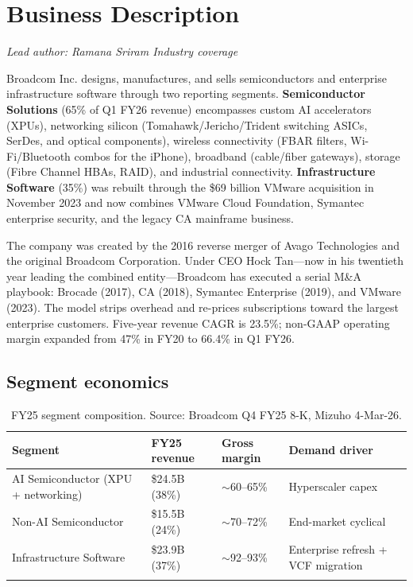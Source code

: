 \documentclass[10pt,letterpaper]{article}
\newcommand{\sectionbyline}[2]{%
\begin{flushright}\vspace{-0.6em}%
{\footnotesize\color{nyugrey}\textit{#1 \textbar{} #2}}%
\end{flushright}\vspace{-0.4em}}
\begin{document}
\section{Business Description}
\sectionbyline{Lead author: Ramana Sriram}{Industry coverage}

Broadcom Inc. designs, manufactures, and sells semiconductors and enterprise infrastructure software through two reporting segments. \textbf{Semiconductor Solutions} (65\% of Q1 FY26 revenue) encompasses custom AI accelerators (XPUs), networking silicon (Tomahawk/Jericho/Trident switching ASICs, SerDes, and optical components), wireless connectivity (FBAR filters, Wi-Fi/Bluetooth combos for the iPhone), broadband (cable/fiber gateways), storage (Fibre Channel HBAs, RAID), and industrial connectivity. \textbf{Infrastructure Software} (35\%) was rebuilt through the \$69 billion VMware acquisition in November 2023 and now combines VMware Cloud Foundation, Symantec enterprise security, and the legacy CA mainframe business.

The company was created by the 2016 reverse merger of Avago Technologies and the original Broadcom Corporation. Under CEO Hock Tan---now in his twentieth year leading the combined entity---Broadcom has executed a serial M\&A playbook: Brocade (2017), CA (2018), Symantec Enterprise (2019), and VMware (2023). The model strips overhead and re-prices subscriptions toward the largest enterprise customers. Five-year revenue CAGR is 23.5\%; non-GAAP operating margin expanded from 47\% in FY20 to 66.4\% in Q1 FY26.

\subsection{Segment economics}

\begin{table}[!ht]
\centering
\small
{}
\begin{tabular}{p{5.6cm}p{3.0cm}p{2.5cm}p{3.5cm}}
\arrayrulecolor{nyuviolet}\toprule
\rowcolor{nyuviolet}\color{white}\textbf{Segment} & \color{white}\textbf{FY25 revenue} & \color{white}\textbf{Gross margin} & \color{white}\textbf{Demand driver} \\
\midrule
AI Semiconductor (XPU + networking) & \$24.5B (38\%)  & $\sim$60--65\% & Hyperscaler capex \\
Non-AI Semiconductor               & \$15.5B (24\%)  & $\sim$70--72\% & End-market cyclical \\
Infrastructure Software            & \$23.9B (37\%)  & $\sim$92--93\% & Enterprise refresh + VCF migration \\
\arrayrulecolor{nyuviolet}\bottomrule
\end{tabular}
\caption{FY25 segment composition. Source: Broadcom Q4 FY25 8-K, Mizuho 4-Mar-26.}
\end{table}
\end{document}
